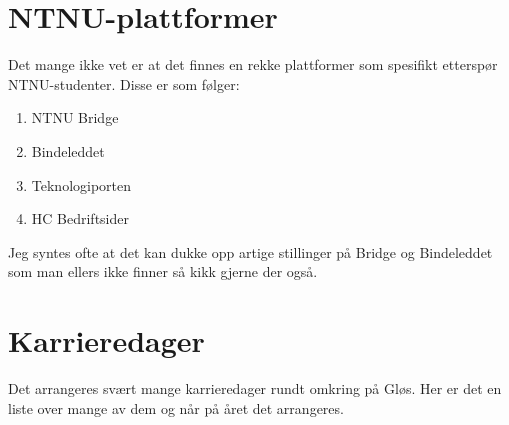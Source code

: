 \section{NTNU-plattformer}

Det mange ikke vet er at det finnes en rekke plattformer som spesifikt etterspør NTNU-studenter. Disse er som følger: 

\begin{enumerate}
    \item NTNU Bridge
    \item Bindeleddet
    \item Teknologiporten
    \item HC Bedriftsider
\end{enumerate}

Jeg syntes ofte at det kan dukke opp artige stillinger på Bridge og Bindeleddet som man ellers ikke finner så kikk gjerne der også. 


\section{Karrieredager}

Det arrangeres svært mange karrieredager rundt omkring på Gløs. Her er det en liste over mange av dem og når på året det arrangeres. 


